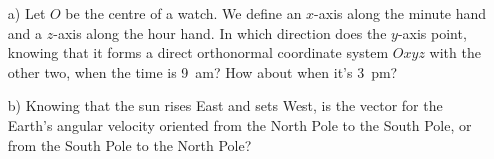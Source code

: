 %
%

\begin{center}
\vspace*{5mm}
\end{center}


\begin{enumerate}
\item[a)] Let $O$ be the centre of a watch. We define an $x$-axis along the minute hand and a $z$-axis along the hour hand. In which direction does the $y$-axis point, knowing that it forms a direct orthonormal coordinate system $Oxyz$ with the other two, when the time is 9~am? How about when it's 3~pm?

\item[b)] Knowing that the sun rises East and sets West, is the vector for the Earth's angular velocity oriented from the North Pole to the South Pole, or from the South Pole to the North Pole?
\end{enumerate}
